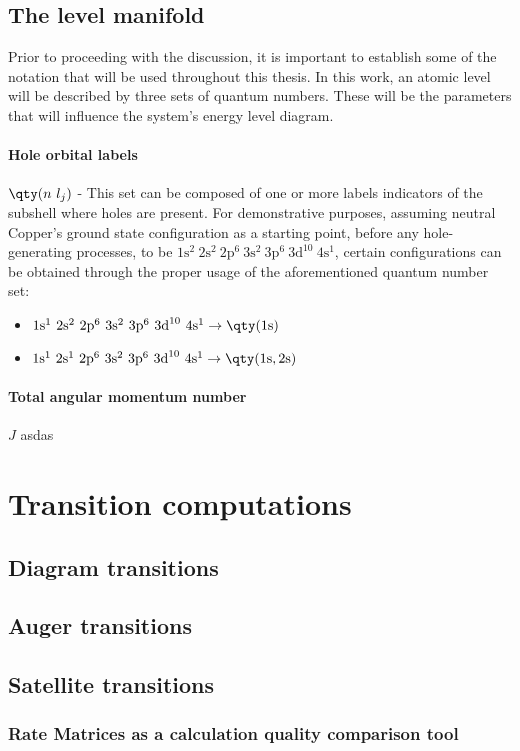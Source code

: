 \subsection{The level manifold}




Prior to proceeding with the discussion, it is important to establish some of the notation that will be used throughout this thesis. In this work, an atomic level will be described by three sets of quantum numbers. These will be the parameters that will influence the system's energy level diagram.

\paragraph{Hole orbital labels}


$\qty(n\ l_j)$ - This set can be composed of one or more labels indicators of the subshell where holes are present.
For demonstrative purposes, assuming neutral Copper's ground state configuration as a starting point, before any hole-generating processes, to be $1\text{s}^2\ 2\text{s}^2\ 2\text{p}^6\ 3\text{s}^2\ 3\text{p}^6\ 3\text{d}^{10}\ 4\text{s}^1$, certain configurations can be obtained through the proper usage of the aforementioned quantum number set:

\begin{itemize}
    \item $1\text{s}^1\ 2\text{s}^2\ 2\text{p}^6\ 3\text{s}^2\ 3\text{p}^6\ 3\text{d}^{10}\ 4\text{s}^1  \rightarrow \qty(1\text{s})$
    \item $1\text{s}^1\ 2\text{s}^1\ 2\text{p}^6\ 3\text{s}^2\ 3\text{p}^6\ 3\text{d}^{10}\ 4\text{s}^1 \rightarrow \qty(1\text{s},2\text{s})$
\end{itemize}

\paragraph{Total angular momentum number}


$J$ asdas




\section{Transition computations}
\subsection{Diagram transitions}
\subsection{Auger transitions}
\subsection{Satellite transitions}

\subsubsection{Rate Matrices as a calculation quality comparison tool}

